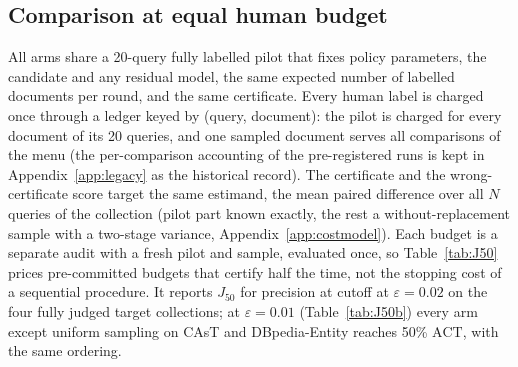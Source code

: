 \documentclass{article}
\newcommand{\eps}{\varepsilon}
\newcommand{\ACT}{\mathrm{ACT}}
\newcommand{\Jfifty}{J_{50}}
\begin{document}
\subsection{Comparison at equal human budget}\label{sec:table2}
All arms share a 20-query fully labelled pilot that fixes policy parameters, the candidate and any residual model, the same expected number of labelled documents per round, and the same certificate. Every human label is charged once through a ledger keyed by (query, document): the pilot is charged for every document of its 20 queries, and one sampled document serves all comparisons of the menu (the per-comparison accounting of the pre-registered runs is kept in Appendix~\ref{app:legacy} as the historical record). The certificate and the wrong-certificate score target the same estimand, the mean paired difference over all $N$ queries of the collection (pilot part known exactly, the rest a without-replacement sample with a two-stage variance, Appendix~\ref{app:costmodel}). Each budget is a separate audit with a fresh pilot and sample, evaluated once, so Table~\ref{tab:J50} prices pre-committed budgets that certify half the time, not the stopping cost of a sequential procedure. It reports $\Jfifty$ for precision at cutoff at $\eps=0.02$ on the four fully judged target collections; at $\eps=0.01$ (Table~\ref{tab:J50b}) every arm except uniform sampling on CAsT and DBpedia-Entity reaches 50\% $\ACT$, with the same ordering.
\end{document}
